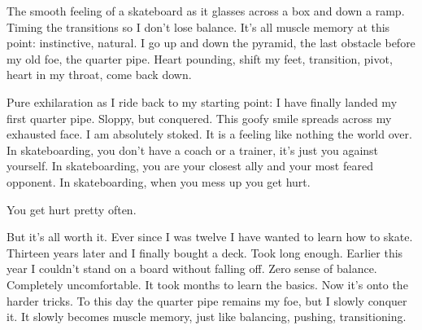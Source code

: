 The smooth feeling of a skateboard as it glasses across a box and down a ramp. Timing the transitions so I don't lose balance. It's all muscle memory at this point: instinctive, natural. I go up and down the pyramid, the last obstacle before my old foe, the quarter pipe. Heart pounding, shift my feet, transition, pivot, heart in my throat, come back down.

Pure exhilaration as I ride back to my starting point: I have finally landed my first quarter pipe. Sloppy, but conquered. This goofy smile spreads across my exhausted face. I am absolutely stoked. It is a feeling like nothing the world over. In skateboarding, you don't have a coach or a trainer, it's just you against yourself. In skateboarding, you are your closest ally and your most feared opponent. In skateboarding, when you mess up you get hurt.

You get hurt pretty often.

But it's all worth it. Ever since I was twelve I have wanted to learn how to skate. Thirteen years later and I finally bought a deck. Took long enough. Earlier this year I couldn't stand on a board without falling off. Zero sense of balance. Completely uncomfortable. It took months to learn the basics. Now it's onto the harder tricks. To this day the quarter pipe remains my foe, but I slowly conquer it. It slowly becomes muscle memory, just like balancing, pushing, transitioning.
